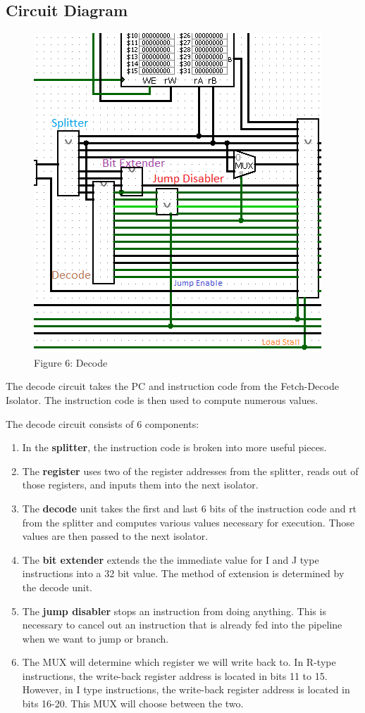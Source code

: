 \documentclass{article}
\begin{document}
\subsection{Circuit Diagram}
\begin{figure}
\vspace{-1.5cm}
\begin{center}
\includegraphics[width=.42\textwidth]{DecodeOut.png} \\
Figure 6: Decode
\end{center}
\vspace{-1.9cm}
\end{figure}
The decode circuit takes the PC and instruction code from the Fetch-Decode Isolator. The instruction code is then used to compute numerous values. 

The decode circuit consists of 6 components: 
\begin{enumerate}
\item
In the \textbf{splitter}, the instruction code is broken into more useful pieces.

\item
The \textbf{register} uses two of the register addresses from the splitter, reads out of those registers, and inputs them into the next isolator.

\item
The \textbf{decode} unit takes the first and last 6 bits of the instruction code and rt from the splitter and computes various values necessary for execution. Those values are then passed to the next isolator. 

\item
The \textbf{bit extender} extends the the immediate value for I and J type instructions into a 32 bit value. The method of extension is determined by the decode unit.
\end{enumerate}

\begin{enumerate}
\setcounter{enumi}{4}
\item
The \textbf{jump disabler} stops an instruction from doing anything. This is necessary to cancel out an instruction that is already fed into the pipeline when we want to jump or branch.

\item
The MUX will determine which register we will write back to. In R-type instructions, the write-back register address is located in bits 11 to 15. However, in I type instructions, the write-back register address is located in bits 16-20. This MUX will choose between the two.
\end{enumerate}
\end{document}
